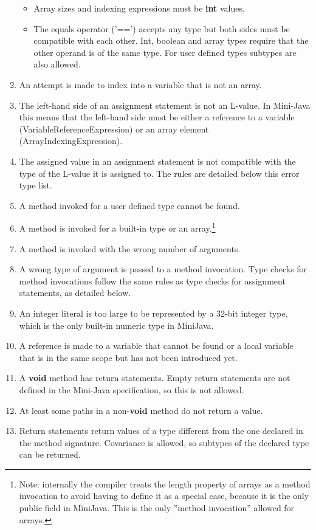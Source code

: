 \documentclass[a4paper,11pt]{article}
\begin{document}
\begin{enumerate}
\begin{itemize}
\item Array sizes and indexing expressions must be \textbf{int} values.
\item The equals operator ('==') accepts any type but both sides must be compatible with each other. Int, boolean and array types require that the other operand is of the same type. For user defined types subtypes are also allowed.
\end{itemize}
\item An attempt is made to index into a variable that is not an array.
\item The left-hand side of an assignment statement is not an L-value. In Mini-Java this means that the left-hand side must be either a reference to a variable (VariableReferenceExpression) or an array element (ArrayIndexingExpression).
\item The assigned value in an assignment statement is not compatible with the type of the L-value it is assigned to. The rules are detailed below this error type list.
\item A method invoked for a user defined type cannot be found.
\item A method is invoked for a built-in type or an array.\footnote{Note: internally the compiler treats the length property of arrays as a method invocation to avoid having to define it as a special case, because it is the only public field in MiniJava. This is the only ''method invocation'' allowed for arrays.}
\item A method is invoked with the wrong number of arguments.
\item A wrong type of argument is passed to a method invocation. Type checks for method invocations follow the same rules as type checks for assignment statements, as detailed below.
\item An integer literal is too large to be represented by a 32-bit integer type, which is the only built-in numeric type in MiniJava.
\item A reference is made to a variable that cannot be found or a local variable that is in the same scope but has not been introduced yet.
\item A \textbf{void} method has return statements. Empty return statements are not defined in the Mini-Java specification, so this is not allowed.
\item At least some paths in a non-\textbf{void} method do not return a value.
\item Return statements return values of a type different from the one declared in the method signature. Covariance is allowed, so subtypes of the declared type can be returned.

\end{enumerate}
\end{document}
